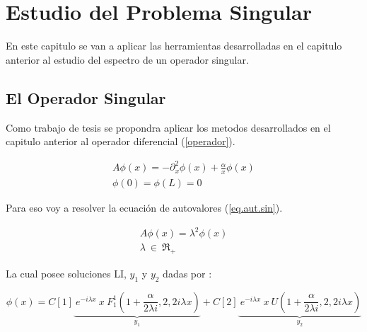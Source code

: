 \chapter{Estudio del Problema Singular}

En este capitulo se van a aplicar las herramientas desarrolladas en el capitulo anterior al estudio del espectro de un operador singular.

\section{El Operador Singular}

Como trabajo de tesis se propondra aplicar los metodos desarrollados en el capitulo anterior al operador diferencial (\ref{operador}).

\begin{equation}
\begin{array}{c}
    A \phi (x) = - \partial ^2 _x  \phi(x) + \frac{\alpha}{x} \phi(x) \\
    \phi(0) = \phi(L) = 0 
\end{array}
\label{operador}
\end{equation}

Para eso voy a resolver la ecuación de autovalores (\ref{eq.aut.sin}).

\begin{equation}
\begin{array}{c}
    A  \phi (x)  =   \lambda ^2 \phi (x) \\ 
    \lambda \ \in \ \mathfrak{R} _+
\end{array}
\label{eq.aut.sin}
\end{equation}




La cual posee soluciones LI, $ y_1 $ y $ y_2 $ dadas por :

\begin{equation}
    \phi (x) = 
    C[1]
    \underbrace{
     \ e ^{-i \lambda x} \ x \ F _{1} ^{1} (1+\frac{ \alpha}{2 \lambda i },2,2 i \lambda x) } _ {y_1}
    + C[2] \underbrace{ \ e^{-i \lambda x } \ x \ U (1+\frac{ \alpha}{2 \lambda i },2,2 i \lambda x) } _{y_2} 
\end{equation}




